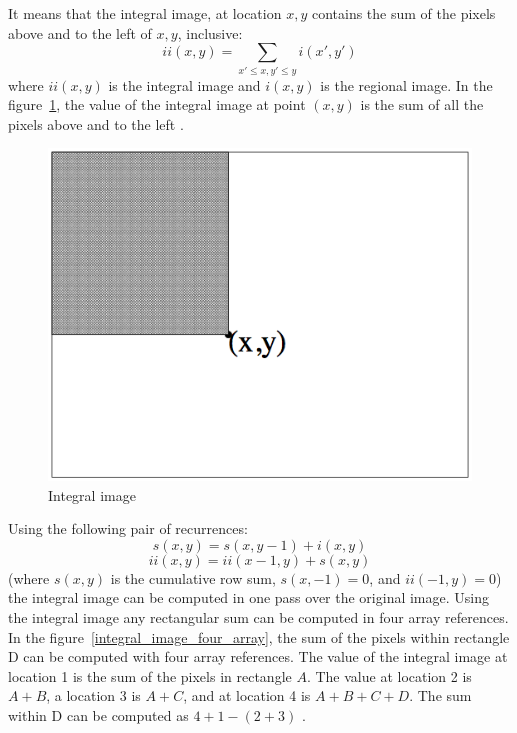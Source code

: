 \noindent It means that the integral image, at location $ x,y $ contains the sum of the pixels above and to the left of $ x,y $, inclusive: \[ ii(x,y) = \sum_{x' \leq x,y' \leq y} i(x',y') \] where $ ii(x,y) $ is the integral image and $ i(x,y) $ is the regional image. In the figure~\ref{integral_image_description}, the value of the integral image at point $ (x,y) $ is the sum of all the pixels above and to the left \cite{VIO01}. 
\newline
	
\begin{figure}[!h]
\begin{center}
\noindent \includegraphics[scale=0.5]{figures/integral_image_description} 
\newline
\caption{Integral image}
\label{integral_image_description}
\end{center} 
\end{figure}
	
\noindent Using the following pair of recurrences: 
\begin{equation}
s(x,y) = s(x,y - 1) + i(x,y)
\end{equation}
\begin{equation}
ii(x,y) = ii(x - 1,y) + s(x,y)
\end{equation}
(where $ s(x,y) $ is the cumulative row sum, $ s(x,-1) = 0 $, and $ ii(-1,y) = 0 $) the integral image can be computed in one pass over the original image. Using the integral image any rectangular sum can be computed in four array references. In the figure~\ref{integral_image_four_array}, the sum of the pixels within rectangle D can be computed with four array references. The value of the integral image at location 1 is the sum of the pixels in rectangle $ A $. The value at location 2 is $ A + B $, a location 3 is $ A + C $, and at location 4 is $ A + B + C + D $. The sum within D can be computed as $ 4 + 1 - (2 + 3) $ \cite{VIO01}. 
\newline

